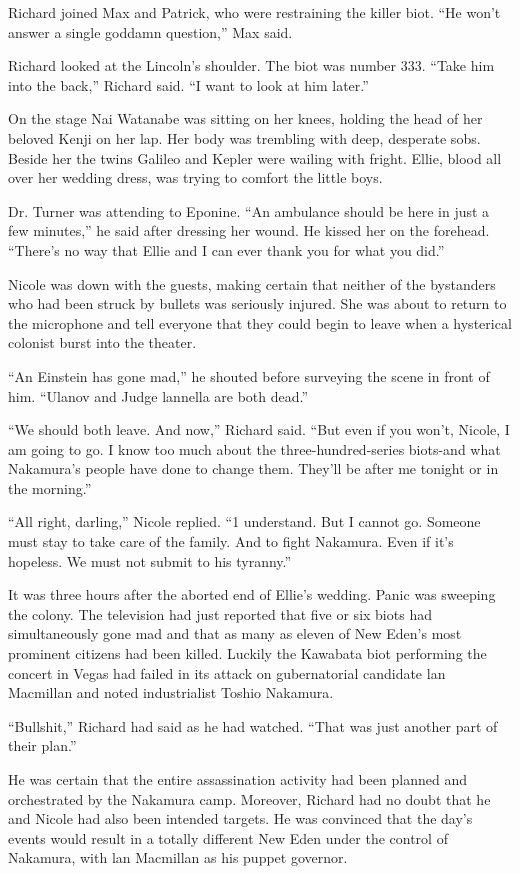 \documentclass[]{article}
\begin{document}
{Richard joined Max and Patrick, who were restraining the killer biot.  “He won’t answer a single goddamn question,” Max said.

Richard looked at the Lincoln’s shoulder.  The biot was number 333.  “Take him into the back,” Richard said.  “I want to look at him later.”

On the stage Nai Watanabe was sitting on her knees, holding the head of her beloved Kenji on her lap.  Her body was trembling with deep, desperate sobs.  Beside her the twins Galileo and Kepler were wailing with fright.  Ellie, blood all over her wedding dress, was trying to comfort the little boys.

Dr.  Turner was attending to Eponine.  “An ambulance should be here in just a few minutes,” he said after dressing her wound.  He kissed her on the forehead.  “There’s no way that Ellie and I can ever thank you for what you did.”

Nicole was down with the guests, making certain that neither of the bystanders who had been struck by bullets was seriously injured.  She was about to return to the microphone and tell everyone that they could begin to leave when a hysterical colonist burst into the theater.

“An Einstein has gone mad,” he shouted before surveying the scene in front of him.  “Ulanov and Judge lannella are both dead.”

“We should both leave.  And now,” Richard said.  “But even if you won’t, Nicole, I am going to go.  I know too much about the three-hundred-series biots-and what Nakamura’s people have done to change them.  They’ll be after me tonight or in the morning.”

“All right, darling,” Nicole replied.  “1 understand.  But I cannot go.  Someone must stay to take care of the family.  And to fight Nakamura.  Even if it’s hopeless.  We must not submit to his tyranny.”

It was three hours after the aborted end of Ellie’s wedding.  Panic was sweeping the colony.  The television had just reported that five or six biots had simultaneously gone mad and that as many as eleven of New Eden’s most prominent citizens had been killed.  Luckily the Kawabata biot performing the concert in Vegas had failed in its attack on gubernatorial candidate lan Macmillan and noted industrialist Toshio Nakamura.

“Bullshit,” Richard had said as he had watched.  “That was just another part of their plan.”

He was certain that the entire assassination activity had been planned and orchestrated by the Nakamura camp.  Moreover, Richard had no doubt that he and Nicole had also been intended targets.  He was convinced that the day’s events would result in a totally different New Eden under the control of Nakamura, with lan Macmillan as his puppet governor.

}
\end{document}
